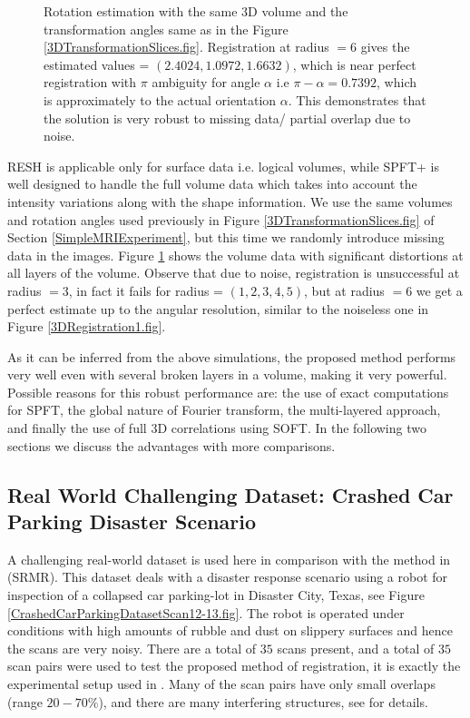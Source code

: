 \documentclass{UCF_ETD}
\begin{document}
\begin{figure}[H]
\begin{center}
\caption{Rotation estimation with the same 3D volume and the transformation angles same as in the Figure \ref{3DTransformationSlices.fig}. Registration at radius $= 6$ gives the estimated values = $(2.4024, 1.0972, 1.6632)$, which is near perfect registration with $\pi$ ambiguity for angle $\alpha$ i.e $\pi -\alpha = 0.7392$, which is approximately to the actual orientation $\alpha$. This demonstrates that the solution is very robust to missing data/ partial overlap due to noise.}
\label{VolumeWithHolesRotationEstimation.fig}
\end{center}
\end{figure}

RESH is applicable only for surface data i.e. logical volumes, while SPFT+ is well designed to handle the full volume data which takes into account the intensity variations along with the shape information. We use the same volumes and rotation angles used previously in Figure \ref{3DTransformationSlices.fig} of Section \ref{SimpleMRIExperiment},  but this time we randomly introduce missing data in the images. Figure \ref{VolumeWithHolesRotationEstimation.fig} shows the volume data with significant distortions at all layers of the volume. Observe that due to noise, registration is unsuccessful at radius  $=3$, in fact it fails for radius = $(1,2,3,4, 5)$, but at radius $= 6$ we get a perfect estimate up to the angular resolution, similar to the noiseless one in Figure \ref{3DRegistration1.fig}. 

As it can be inferred from the above simulations, the proposed method performs very well even with several broken layers in a volume, making it very powerful. Possible reasons for this robust performance are: the use of exact computations for SPFT, the global nature of Fourier transform, the multi-layered approach, and finally the use of full $3$D correlations using SOFT. In the following two sections we discuss the advantages with more comparisons.

\subsection{Real World Challenging Dataset: Crashed Car Parking Disaster Scenario} \label{ChallengingDatasetExperiment}
A challenging real-world dataset is used here in comparison with the method in \cite{Bulow2013} (SRMR). This dataset deals with a disaster response scenario using a robot for inspection of a collapsed car parking-lot in Disaster City, Texas, see Figure \ref{CrashedCarParkingDatasetScan12-13.fig}. The robot is operated under conditions with high amounts of rubble and dust on slippery surfaces and hence the scans are very noisy. There are a total of $35$ scans present, and a total of $35$ scan pairs were used to test the proposed method of registration, it is exactly the experimental setup used in \cite{Bulow2013}. Many of the scan pairs have only small overlaps (range $20-70\%$), and there are many interfering structures, see \cite{Bulow2013} for details.
\end{document}

